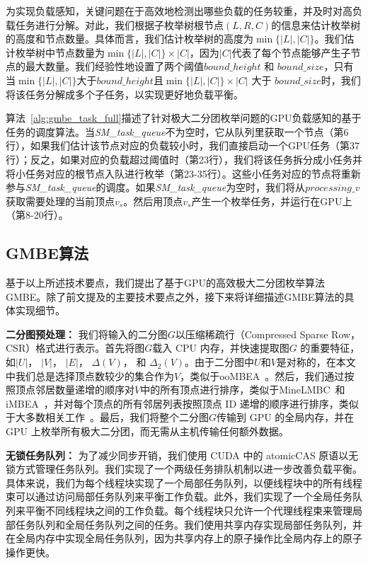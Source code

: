 为实现负载感知，关键问题在于高效地检测出哪些负载的任务较重，并及时对高负载任务进行分解。对此，我们根据子枚举树根节点$(L,R,C)$的信息来估计枚举树的高度和节点数量。具体而言，我们估计枚举树的高度为$\min\{|L|,|C|\}$。我们估计枚举树中节点数量为$\min\{|L|,|C|\}\times|C|$，因为$|C|$代表了每个节点能够产生子节点的最大数量。我们经验性地设置了两个阈值$bound\_height$ 和 $bound\_size$，只有当$\min\{|L|,|C|\}$大于$bound\_height$且$\min\{|L|,|C|\}\times|C|$ 大于 $bound\_size$时，我们将该任务分解成多个子任务，以实现更好地负载平衡。

算法~\ref{alg:gmbe_task_full}描述了针对极大二分团枚举问题的GPU负载感知的基于任务的调度算法。当\textit{SM\_task\_queue}不为空时，它从队列里获取一个节点（第6行），如果我们估计该节点对应的负载较小时，我们直接启动一个GPU任务（第37行）；反之，如果对应的负载超过阈值时（第23行），我们将该任务拆分成小任务并将小任务对应的根节点入队进行枚举（第23-35行）。这些小任务对应的节点将重新参与\textit{SM\_task\_queue}的调度。如果\textit{SM\_task\_queue}为空时，我们将从$processing\_v$获取需要处理的当前顶点$v_s$。然后用顶点$v_s$产生一个枚举任务，并运行在GPU上（第8-20行）。



\subsection{GMBE算法}

基于以上所述技术要点，我们提出了基于GPU的高效极大二分团枚举算法GMBE。除了前文提及的主要技术要点之外，接下来将详细描述GMBE算法的具体实现细节。

\textbf{二分图预处理：} 我们将输入的二分图$G$以压缩稀疏行（Compressed Sparse Row，CSR）格式进行表示。首先将图$G$载入 CPU 内存，并快速提取图$G$ 的重要特征，如$|U|$， $|V|$， $|E|$， 
$\Delta(V)$， 和 $\Delta_2(V)$。由于二分图中$U$和$V$是对称的，在本文中我们总是选择顶点数较少的集合作为$V$，类似于ooMBEA~\cite{ooMBE22}。然后，我们通过按照顶点邻居数量递增的顺序对$V$中的所有顶点进行排序，类似于MineLMBC~\cite{minel06}和iMBEA~\cite{iMBEA14}，并对每个顶点的所有邻居列表按照顶点 ID 递增的顺序进行排序，类似于大多数相关工作~\cite{g2miner22,Kclique22}。最后，我们将整个二分图$G$传输到 GPU 的全局内存，并在 GPU 上枚举所有极大二分团，而无需从主机传输任何额外数据。

\textbf{无锁任务队列：} 为了减少同步开销，我们使用 CUDA 中的 \textsf{atomicCAS} 原语以无锁方式管理任务队列。我们实现了一个两级任务排队机制以进一步改善负载平衡。具体来说，我们为每个线程块实现了一个局部任务队列，以便线程块中的所有线程束可以通过访问局部任务队列来平衡工作负载。此外，我们实现了一个全局任务队列来平衡不同线程块之间的工作负载。每个线程块只允许一个代理线程束来管理局部任务队列和全局任务队列之间的任务。我们使用共享内存实现局部任务队列，并在全局内存中实现全局任务队列，因为共享内存上的原子操作比全局内存上的原子操作更快。

